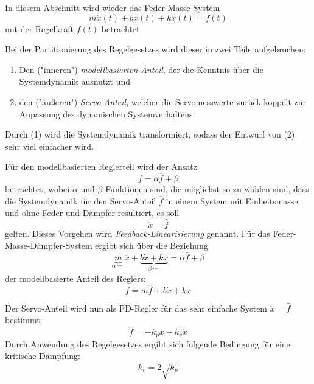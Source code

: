		In diesem Abschnitt wird wieder das Feder-Masse-System
		\begin{equation*}
			m\ddot{x}(t) + b\dot{x}(t) + kx(t) = f(t)
		\end{equation*}
		mit der Regelkraft \( f(t) \) betrachtet.

		Bei der Partitionierung des Regelgesetzes wird dieser in zwei Teile aufgebrochen:
		\begin{enumerate}
			\item Den ("inneren") \emph{modellbasierten Anteil}, der die Kenntnis über die Systemdynamik ausnutzt und
			\item den ("äußeren") \emph{Servo-Anteil}, welcher die Servomesswerte zurück koppelt zur Anpassung des dynamischen Systemverhaltens.
		\end{enumerate}
		Durch (1) wird die Systemdynamik transformiert, sodass der Entwurf von (2) sehr viel einfacher wird.

		Für den modellbasierten Reglerteil wird der Ansatz
		\begin{equation*}
			f = \alpha \hat{f} + \beta
		\end{equation*}
		betrachtet, wobei \( \alpha \) und \( \beta \) Funktionen sind, die möglichst so zu wählen sind, dass die Systemdynamik für den Servo-Anteil \( \hat{f} \) in einem System mit Einheitsmasse und ohne Feder und Dämpfer resultiert, \dh es soll
		\begin{equation*}
			\ddot{x} = \hat{f}
		\end{equation*}
		gelten. Dieses Vorgehen wird \emph{Feedback-Linearisierung} genannt. Für das Feder-Masse-Dämpfer-System ergibt sich über die Beziehung
		\begin{equation*}
			\underbrace{m}_{\alpha \coloneqq}\ddot{x} + \underbrace{b\dot{x} + kx}_{\beta \coloneqq} = \alpha \hat{f} + \beta
		\end{equation*}
		der modellbasierte Anteil des Reglers:
		\begin{equation*}
			f = m \hat{f} + b\dot{x} + kx
		\end{equation*}

		Der Servo-Anteil wird nun als PD-Regler für das sehr einfache System \( \ddot{x} = \hat{f} \) bestimmt:
		\begin{equation*}
			\hat{f} = -k_p x - k_v \dot{x}
		\end{equation*}
		Durch Anwendung des Regelgesetzes ergibt sich folgende Bedingung für eine kritische Dämpfung:
		\begin{equation*}
			k_v = 2 \sqrt{k_p}
		\end{equation*}

